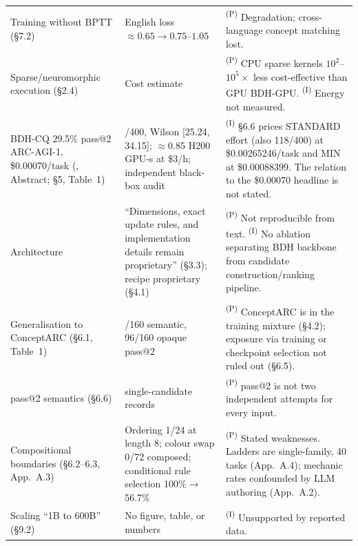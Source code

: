 \documentclass[11pt]{article}
\theoremstyle{remark}
\newcommand{\PS}{\textsuperscript{(P)}}
\newcommand{\IN}{\textsuperscript{(I)}}
\begin{document}
\begin{table}[!htbp]
\begin{tabularx}{\linewidth}{@{}>{\raggedright\arraybackslash}p{3.4cm}>{\raggedright\arraybackslash}X>{\raggedright\arraybackslash}X@{}}
Training without BPTT (\S7.2) & English loss $\approx0.65\to0.75$--$1.05$ & \PS{} Degradation; cross-language concept matching lost.\\
Sparse/neuromorphic execution (\S2.4) & Cost estimate & \PS{} CPU sparse kernels $10^2$--$10^5\times$ less cost-effective than GPU BDH-GPU. \IN{} Energy not measured.\\
\midrule
BDH-CQ 29.5\% pass@2 ARC-AGI-1, \$0.00070/task (\citealp{engdahl2026bdhcq}, Abstract; \S5, Table~1) &
118/400, Wilson [25.24, 34.15]; $\approx$0.85 H200 GPU-s at \$3/h; independent black-box audit &
\IN{} \S6.6 prices STANDARD effort (also 118/400) at \$0.00265246/task and MIN at \$0.00088399. The relation to the \$0.00070 headline is not stated.\\
Architecture & ``Dimensions, exact update rules, and implementation details remain proprietary'' (\S3.3); recipe proprietary (\S4.1) &
\PS{} Not reproducible from text. \IN{} No ablation separating BDH backbone from candidate construction/ranking pipeline.\\
Generalisation to ConceptARC (\S6.1, Table~1) & 95/160 semantic, 96/160 opaque pass@2 &
\PS{} ConceptARC is in the training mixture (\S4.2); exposure via training or checkpoint selection not ruled out (\S6.5).\\
pass@2 semantics (\S6.6) & 75 single-candidate records & \PS{} pass@2 is not two independent attempts for every input.\\
Compositional boundaries (\S6.2--6.3, App.~A.3) & Ordering 1/24 at length 8; colour swap 0/72 composed; conditional rule selection 100\%$\to$56.7\% &
\PS{} Stated weaknesses. Ladders are single-family, 40 tasks (App.~A.4); mechanic rates confounded by LLM authoring (App.~A.2).\\
Scaling ``1B to 600B'' (\S9.2) & No figure, table, or numbers & \IN{} Unsupported by reported data.\\
\bottomrule
\end{tabularx}
\end{table}
\end{document}
